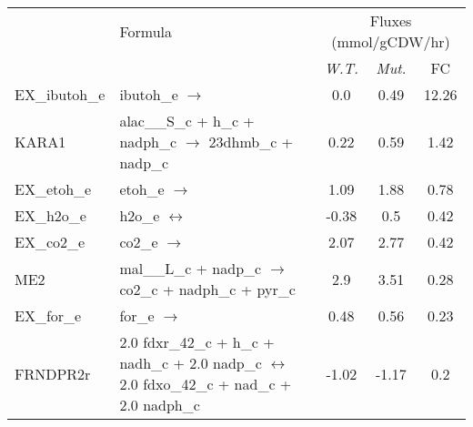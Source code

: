 
\begin{tabular}{lp{}ccc}
\toprule
\rowcolor{white} \multirow{1}{*}{ID} & \multirow{1}{*}{Formula}  & \multicolumn{3}{c}{Fluxes (mmol/gCDW/hr)} \\
\rowcolor{white} 		     &             		 & \emph{W.T.} & \emph{Mut.} 		     & FC\\
\midrule
EX\_ibutoh\_e	&	ibutoh\_e $\rightarrow$ 	&	0.0	&	0.49	&	12.26	\\
KARA1	&	alac\_\_S\_c + h\_c + nadph\_c $\rightarrow$ 23dhmb\_c + nadp\_c	&	0.22	&	0.59	&	1.42	\\
EX\_etoh\_e	&	etoh\_e $\rightarrow$ 	&	1.09	&	1.88	&	0.78	\\
EX\_h2o\_e	&	h2o\_e $\leftrightarrow$ 	&	-0.38	&	0.5	&	0.42	\\
EX\_co2\_e	&	co2\_e $\rightarrow$ 	&	2.07	&	2.77	&	0.42	\\
ME2	&	mal\_\_L\_c + nadp\_c $\rightarrow$ co2\_c + nadph\_c + pyr\_c	&	2.9	&	3.51	&	0.28	\\
EX\_for\_e	&	for\_e $\rightarrow$ 	&	0.48	&	0.56	&	0.23	\\
FRNDPR2r	&	2.0 fdxr\_42\_c + h\_c + nadh\_c + 2.0 nadp\_c $\leftrightarrow$ 2.0 fdxo\_42\_c + nad\_c + 2.0 nadph\_c	&	-1.02	&	-1.17	&	0.2	\\

\end{tabular}
